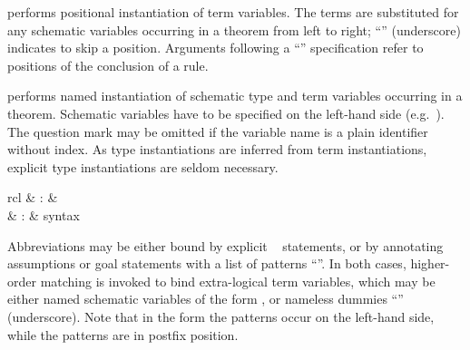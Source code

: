 \begin{isabellebody}
\begin{isamarkuptext}
\begin{descr}
  \item [\mbox{\isa{of}}~\isa{t\isactrlsub {\isadigit{1}}\ {\isasymdots}\ t\isactrlsub n}] performs
  positional instantiation of term variables.  The terms  are substituted for any schematic
  variables occurring in a theorem from left to right; ``\isa{{\isacharunderscore}}'' (underscore) indicates to skip a position.  Arguments following
  a ``\mbox{}\isa{{\isacharcolon}}'' specification refer to positions
  of the conclusion of a rule.
  
  \item [\mbox{\isa{where}}~\isa{x\isactrlsub {\isadigit{1}}\ {\isacharequal}\ t\isactrlsub {\isadigit{1}}\ {\isasymAND}\ {\isasymdots}\ x\isactrlsub n\ {\isacharequal}\ t\isactrlsub n}] performs named instantiation of schematic
  type and term variables occurring in a theorem.  Schematic variables
  have to be specified on the left-hand side (e.g.\ ).
  The question mark may be omitted if the variable name is a plain
  identifier without index.  As type instantiations are inferred from
  term instantiations, explicit type instantiations are seldom
  necessary.

  \end{descr}%
\end{isamarkuptext}%
\isamarkuptrue%
%
\isamarkuptrue%
%
\begin{isamarkuptext}%
\begin{matharray}{rcl}
    \mbox{} & : &  \\
    \mbox{} & : & syntax \\
  \end{matharray}

  Abbreviations may be either bound by explicit \mbox{}~ statements, or by annotating assumptions or
  goal statements with a list of patterns ``''.  In both cases, higher-order matching is invoked to
  bind extra-logical term variables, which may be either named
  schematic variables of the form , or nameless dummies
  ``\mbox{\isa{{\isacharunderscore}}}'' (underscore). Note that in the \mbox{}
  form the patterns occur on the left-hand side, while the \mbox{} patterns are in postfix position.


\end{isamarkuptext}
\end{isabellebody}
